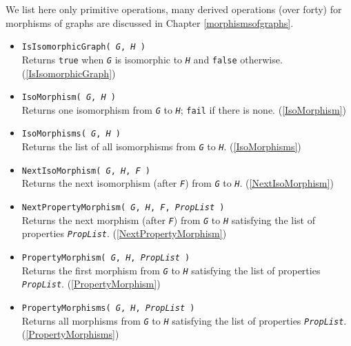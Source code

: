 \documentclass[a4paper,11pt]{report}
\begin{document}
{{We list here only primitive operations, many derived operations (over forty)
for morphisms of graphs are discussed in Chapter \ref{morphismsofgraphs}. 
\begin{itemize}
\item \texttt{IsIsomorphicGraph( \mbox{\texttt{\mdseries\slshape G}}, \mbox{\texttt{\mdseries\slshape H}} )}\\
 Returns \texttt{true} when \mbox{\texttt{\mdseries\slshape G}} is isomorphic to \mbox{\texttt{\mdseries\slshape H}} and \texttt{false} otherwise. (\ref{IsIsomorphicGraph}) 
\item \texttt{IsoMorphism( \mbox{\texttt{\mdseries\slshape G}}, \mbox{\texttt{\mdseries\slshape H}} )}\\
 Returns one isomorphism from \mbox{\texttt{\mdseries\slshape G}} to \mbox{\texttt{\mdseries\slshape H}}; \texttt{fail} if there is none. (\ref{IsoMorphism}) 
\item \texttt{IsoMorphisms( \mbox{\texttt{\mdseries\slshape G}}, \mbox{\texttt{\mdseries\slshape H}} )}\\
 Returns the list of all isomorphisms from \mbox{\texttt{\mdseries\slshape G}} to \mbox{\texttt{\mdseries\slshape H}}. (\ref{IsoMorphisms}) 
\item \texttt{NextIsoMorphism( \mbox{\texttt{\mdseries\slshape G}}, \mbox{\texttt{\mdseries\slshape H}}, \mbox{\texttt{\mdseries\slshape F}} )}\\
 Returns the next isomorphism (after \mbox{\texttt{\mdseries\slshape F}}) from \mbox{\texttt{\mdseries\slshape G}} to \mbox{\texttt{\mdseries\slshape H}}. (\ref{NextIsoMorphism}) 
\item \texttt{NextPropertyMorphism( \mbox{\texttt{\mdseries\slshape G}}, \mbox{\texttt{\mdseries\slshape H}}, \mbox{\texttt{\mdseries\slshape F}}, \mbox{\texttt{\mdseries\slshape PropList}} )}\\
 Returns the next morphism (after \mbox{\texttt{\mdseries\slshape F}}) from \mbox{\texttt{\mdseries\slshape G}} to \mbox{\texttt{\mdseries\slshape H}} satisfying the list of properties \mbox{\texttt{\mdseries\slshape PropList}}. (\ref{NextPropertyMorphism}) 
\item \texttt{PropertyMorphism( \mbox{\texttt{\mdseries\slshape G}}, \mbox{\texttt{\mdseries\slshape H}}, \mbox{\texttt{\mdseries\slshape PropList}} )}\\
 Returns the first morphism from \mbox{\texttt{\mdseries\slshape G}} to \mbox{\texttt{\mdseries\slshape H}} satisfying the list of properties \mbox{\texttt{\mdseries\slshape PropList}}. (\ref{PropertyMorphism}) 
\item \texttt{PropertyMorphisms( \mbox{\texttt{\mdseries\slshape G}}, \mbox{\texttt{\mdseries\slshape H}}, \mbox{\texttt{\mdseries\slshape PropList}} )}\\
 Returns all morphisms from \mbox{\texttt{\mdseries\slshape G}} to \mbox{\texttt{\mdseries\slshape H}} satisfying the list of properties \mbox{\texttt{\mdseries\slshape PropList}}. (\ref{PropertyMorphisms}) 
\end{itemize}
 }

}
\end{document}
